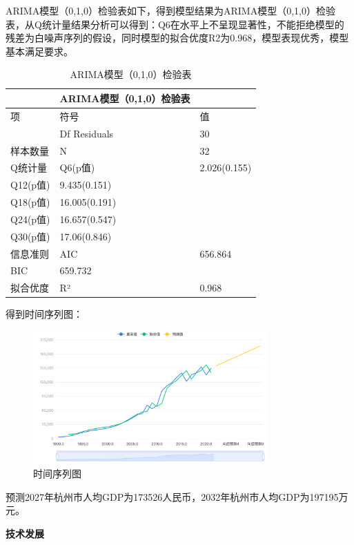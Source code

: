 \documentclass[12pt, a4paper, oneside]{ctexart}
\begin{document}
ARIMA模型（0,1,0）检验表如下，得到模型结果为ARIMA模型（0,1,0）检验表，从Q统计量结果分析可以得到：Q6在水平上不呈现显著性，不能拒绝模型的残差为白噪声序列的假设，同时模型的拟合优度R2为0.968，模型表现优秀，模型基本满足要求。

\begin{table}[H]
  \centering
  \begin{tabularx}{0.9\textwidth}{XXX}
  \toprule
  & ARIMA模型（0,1,0）检验表 & \\
  \midrule
  项 & 符号 & 值 \\
  & Df Residuals & 30 \\
  样本数量 & N & 32 \\
  Q统计量 & Q6(p值) & 2.026(0.155) \\
  Q12(p值) & 9.435(0.151) & \\
  Q18(p值) & 16.005(0.191) & \\
  Q24(p值) & 16.657(0.547) & \\
  Q30(p值) & 17.06(0.846) & \\
  信息准则 & AIC & 656.864 \\
  BIC & 659.732 & \\
  拟合优度 & R² & 0.968 \\
  \bottomrule
  \end{tabularx}
  \caption{ARIMA模型（0,1,0）检验表}
  \label{tab:arima}
\end{table}

得到时间序列图：

\begin{figure}[H]
  \centering
  \includegraphics[width=0.8\textwidth]{pic/时间序列图.png}
  \caption{时间序列图}
  \label{fig:时间序列图}
\end{figure}



预测2027年杭州市人均GDP为173526人民币，2032年杭州市人均GDP为197195万元。

\textbf{技术发展}
\end{document}
